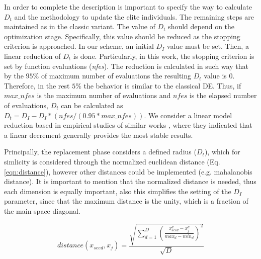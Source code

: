 In order to complete the description is important to specify the way to calculate $D_t$ and the methodology to update the 
elite individuals.
%
The remaining steps are maintained as in the classic \DE{} variant.
%
The value of $D_t$ should depend on the optimization stage.
%
Specifically, this value should be reduced as the stopping criterion is approached.
%
In our scheme, an initial $D_I$ value must be set.
%
Then, a linear reduction of $D_t$ is done.
%
Particularly, in this work, the stopping criterion is set by function evaluations (\textit{nfes}).
%
The reduction is calculated in such way that by the $95\%$ of maximum number of evaluations the resulting $D_t$ value is $0$.
%
Therefore, in the rest $5\%$ the behavior is similar to the classical DE.
%
Thus, if $max\_nfes$ is the maximum number of evaluations and $nfes$ is the elapsed number of evaluations, $D_t$ can be calculated as $D_t=D_I - D_I *(nfes/(0.95*max\_nfes))$.
%
We consider a linear model reduction based in empirical studies of similar works \cite{segura2016novel}, where they indicated that a linear decrement generally provides the most stable results.
%

Principally, the replacement phase considers a defined radius ($D_t$), which for simlicity is considered through the normalized euclidean distance (Eq. \ref{eqn:distance}), however other distances could be implemented (e.g. mahalanobis distance).
%
It is important to mention that the normalized distance is needed, thus each dimension is equally important, also this simplifies the setting of the $D_I$ parameter, since that the maximum distance is the unity, which is a fraction of the main space diagonal.

\begin{equation}\label{eqn:distance}
distance ( x_{seed}, x_j ) = \frac{\sqrt{ \sum_{d=1}^D \left ( \frac{x_{seed}^d - x_j^d}{max_d - min_d} \right )^2  }} {\sqrt{D}}
\end{equation}



